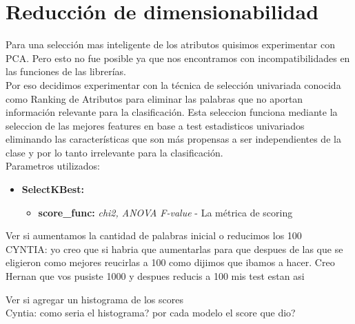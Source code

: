 \section{Reducción de dimensionabilidad}


Para una selección mas inteligente de los atributos quisimos experimentar con PCA. Pero esto no fue posible ya que nos encontramos con incompatibilidades en las funciones de las librerías. \\


Por eso decidimos experimentar con la técnica de selección univariada conocida como Ranking de Atributos para eliminar las palabras que no aportan información relevante para la clasificación. Esta seleccion funciona mediante la seleccion de las mejores features en base a test estadisticos univariados eliminando las características que son más propensas a ser independientes de la clase y por lo tanto irrelevante para la clasificación.\\
  
Parametros utilizados:

\begin{itemize}
\item \textbf{SelectKBest:} 
	\begin{itemize}
	\item \textbf{score\_func:} \textit{chi2, ANOVA F-value} - La métrica de scoring
	\end{itemize}
\end{itemize}



{\Large Ver si aumentamos la cantidad de palabras inicial o reducimos los 100\\
CYNTIA: yo creo que si habria que aumentarlas para que despues de las que se eligieron como mejores reucirlas a 100 como dijimos que ibamos a hacer. Creo Hernan que vos pusiste 1000 y despues reducis a 100 mis test estan asi
}

{\Large Ver si agregar un histograma de los scores\\
Cyntia: como seria el histograma? por cada modelo el score que dio? 
}
